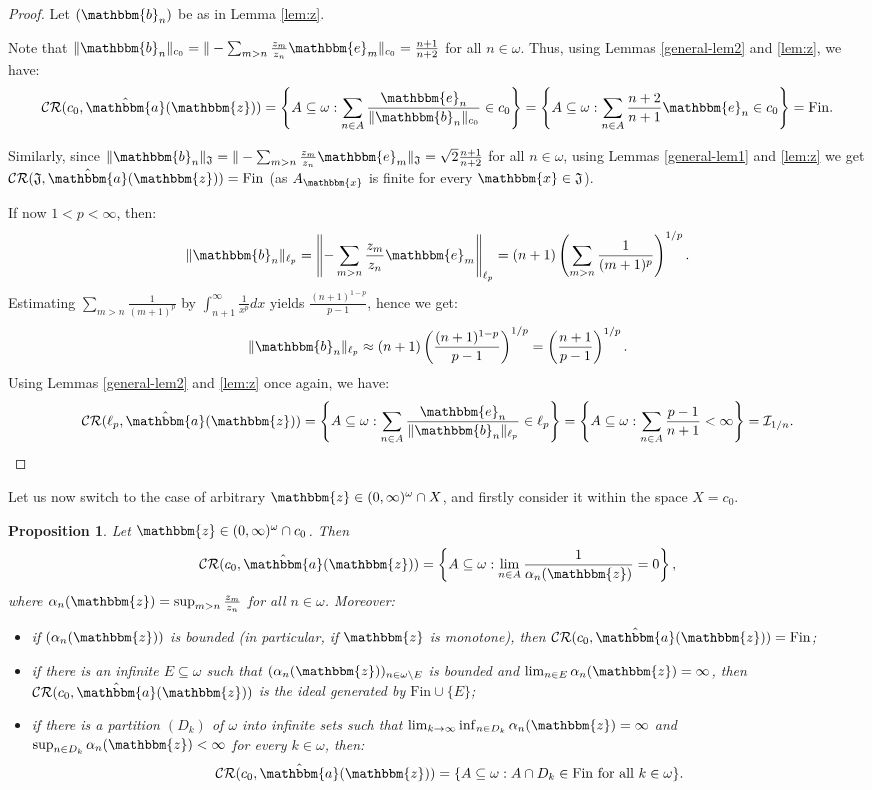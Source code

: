 \documentclass{amsart}
\newcommand{\I}{\mathcal{I}}
\newcommand{\mf}{\mathfrak}
\newcommand{\Fin}{\mathrm{Fin}}
\newcommand{\CR}{\mathcal{CR}}
\newcommand{\w}{\mathbbm}
\newtheorem{proposition}[theorem]{Proposition}
\begin{document}
\begin{proof}
Let $(\w{b}_n)$ be as in Lemma \ref{lem:z}.

Note that $\|\w{b}_n\|_{c_0}=\|-\sum_{m>n}\frac{z_m}{z_n}\w{e}_m\|_{c_0}=\frac{n+1}{n+2}$ for all $n\in\omega$. Thus, using Lemmas \ref{general-lem2} and \ref{lem:z}, we have:
\[
\CR(c_0,\hat{\w{a}}(\w{z}))=\left\{A\subseteq\omega:\sum_{n\in A}\frac{\w{e}_n}{\|\w{b}_n\|_{c_0}}\in c_0\right\}=\left\{A\subseteq\omega:\sum_{n\in A}\frac{n+2}{n+1}\w{e}_n\in c_0\right\}=\Fin.
\]

Similarly, since $\|\w{b}_n\|_{\mf{J}}=\|-\sum_{m>n}\frac{z_m}{z_n}\w{e}_m\|_{\mf{J}}=\sqrt{2}\frac{n+1}{n+2}$ for all $n\in\omega$, using Lemmas \ref{general-lem1} and \ref{lem:z} we get $\CR(\mathfrak{J},\hat{\w{a}}(\w{z}))=\Fin$ (as $A_{\w{x}}$ is finite for every $\w{x}\in\mf{J}$).

If now $1<p<\infty$, then:
\[
\|\w{b}_n\|_{\ell_p}=\left\|-\sum_{m>n}\frac{z_m}{z_n}\w{e}_m\right\|_{\ell_p}=(n+1)\left(\sum_{m>n}\frac{1}{(m+1)^p}\right)^{1/p}.
\]
Estimating $\sum_{m>n}\frac{1}{(m+1)^p}$ by $\int_{n+1}^\infty \frac{1}{x^p} dx $ yields $\frac{(n+1)^{1-p}}{p-1}$, hence we get:
\[
\|\w{b}_n\|_{\ell_p}\approx(n+1)\left(\frac{(n+1)^{1-p}}{p-1}\right)^{1/p}=\left(\frac{n+1}{p-1}\right)^{1/p}.
\]
Using Lemmas \ref{general-lem2} and \ref{lem:z} once again, we have:
\[
\CR(\ell_p,\hat{\w{a}}(\w{z}))=\left\{A\subseteq\omega: \sum_{n\in A}\frac{\w{e}_n}{\|\w{b}_n\|_{\ell_p}}\in\ell_p\right\}=\left\{A\subseteq\omega: \sum_{n\in A}\frac{p-1}{n+1}<\infty\right\}=\I_{1/n}.
\]
\end{proof}

Let us now switch to the case of arbitrary $\w{z}\in (0,\infty)^\omega\cap X$, and firstly consider it within the space $X=c_0$. 

\begin{proposition}
\label{z:c_0}
Let $\w{z}\in (0,\infty)^\omega\cap c_0$. Then 
\[
\CR(c_0, \hat{\w{a}}(\w{z}))=\left\{A\subseteq\omega: \lim_{n\in A}\frac{1}{\alpha_n(\w{z})}=0\right\},
\]
where $\alpha_n(\w{z})=\sup_{m>n}\frac{z_m}{z_n}$ for all $n\in\omega$. Moreover:
\begin{itemize}
    \item[(a)] if  $(\alpha_n(\w{z}))$ is bounded (in particular, if $\w{z}$ is monotone), then $\CR(c_0,\hat{\w{a}}(\w{z}))=\Fin$;
    \item[(b)] if there is an infinite $E\subseteq\omega$ such that $(\alpha_n(\w{z}))_{n\in\omega\setminus E}$ is bounded and $\lim_{n\in E}\alpha_n(\w{z})=\infty$, then $\CR(c_0,\hat{\w{a}}(\w{z}))$ is the ideal generated by $\Fin\cup\{E\}$; 
    \item[(c)] if there is a partition $(D_k)$ of $\omega$ into infinite sets such that $\lim_{k\to\infty}\inf_{n \in D_k} \alpha_n(\w{z})=\infty$ and $\sup_{n \in D_k} \alpha_n(\w{z}) < \infty$ for every $k\in\omega$, then:
    \[
    \CR(c_0,\hat{\w{a}}(\w{z}))=\{A\subseteq\omega:A\cap D_k\in\Fin\text{ for all }k\in\omega\}.\]
\end{itemize}
\end{proposition}
\end{document}
